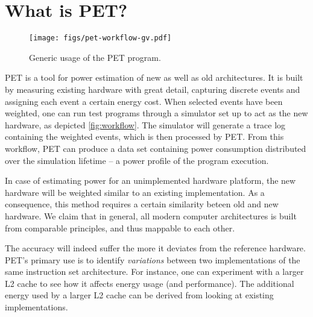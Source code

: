 \section{What is PET?}
\label{sec:whatispet}
\begin{figure}
    \texttt{[image: figs/pet-workflow-gv.pdf]}
    \caption{Generic usage of the PET program.}
    \label{fig:workflow}
\end{figure}

PET is a tool for power estimation of new as well as old architectures. It is
built by measuring existing hardware with great detail, capturing discrete events
and assigning each event a certain energy cost. When selected events have been
weighted, one can run test programs through a simulator set up to act as the
new hardware, as depicted \autoref{fig:workflow}. The simulator will generate a
trace log containing the weighted events, which is then processed by PET.
From this workflow, PET can produce a data set containing power consumption
distributed over the simulation lifetime -- a power profile of the program
execution.

In case of estimating power for an unimplemented hardware platform, the new
hardware will be weighted similar to an existing implementation. As a
consequence, this method requires a certain similarity beteen old and new
hardware. We claim that in general, all modern computer architectures is built
from comparable principles, and thus mappable to each other.

The accuracy will indeed suffer the more it deviates from the reference
hardware. PET's primary use is to identify \emph{variations} between two
implementations of the same instruction set architecture. For instance, one can
experiment with a larger L2 cache to see how it affects energy usage (and
performance). The additional energy used by a larger L2 cache can be derived
from looking at existing implementations.

